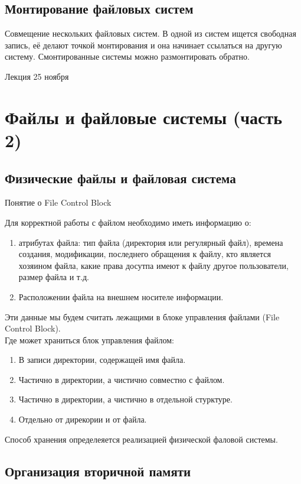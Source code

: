\documentclass[12pt, a4paper]{article}
\begin{document}
    \subsection[short]{Монтирование файловых систем}
    Совмещение нескольких файловых систем. В одной из систем ищется свободная запись, её делают точкой монтирования и она начинает ссылаться на другую систему. Смонтированные системы можно размонтировать обратно.
    \begin{center}
        Лекция 25 ноября
    \end{center}
    \section{Файлы и файловые системы (часть 2)}
    \subsection*{Физические файлы и файловая система}
    \begin{center}
        Понятие о File Control Block
    \end{center}
    Для корректной работы с файлом необходимо иметь информацию о:
    \begin{enumerate}
        \item атрибутах файла: тип файла (директория или регулярный файл), времена создания, модификации, последнего обращения к файлу, кто является хозяином файла, какие права досутпа имеют к файлу другое пользователи, размер файла и т.д.
        \item Расположении файла на внешнем носителе информации.
    \end{enumerate}
    Эти данные мы будем считать лежащими в блоке управления файлами (File Control Block).\\
    Где может храниться блок управления файлом:
    \begin{enumerate}
        \item В записи директории, содержащей имя файла.
        \item Частично в директории, а чистично совместно с файлом.
        \item Частично в директории, а чистично в отдельной стурктуре.
        \item Отдельно от дирекории и от файла.
    \end{enumerate}
    Способ хранения определеяется реализацией физической фаловой системы.\\
    \subsection{Организация вторичной памяти}
\end{document}

